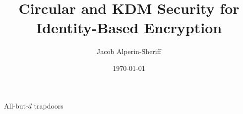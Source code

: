 \documentclass{beamer}%
\title{Circular and KDM Security for Identity-Based Encryption}
\author{%
  Jacob Alperin-Sheriff\footnotemark[1]  %
}
\institute{\footnotemark[1]based on work with Chris Peikert}
\date{\today}
\begin{document}
\begin{frame}[label=title]
\titlepage
\end{frame}





 







\begin{frame}{All-but-$d$ trapdoors}


\end{frame}
\end{document}
